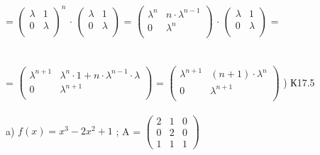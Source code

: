 \documentclass[12pt, a4paper]{article}
\begin{document}
	=
	\begin{math}
		\left(
		\begin{array}{rr}
			\lambda  & 1 \\
			0 & \lambda\\
		\end{array}
		\right ) ^n
	\end{math}
	$\cdot$
	\begin{math}
		\left(
		\begin{array}{rr}
			\lambda  & 1 \\
			0 & \lambda\\
		\end{array}
		\right )
	\end{math}
	=
	\begin{math}
		\left(
		\begin{array}{rr}
			\lambda^n  & n\cdot \lambda^{n - 1} \\
			0 & \lambda^n\\
		\end{array}
		\right ) 
	\end{math}
	$\cdot$
	\begin{math}
		\left(
		\begin{array}{rr}
			\lambda  & 1 \\
			0 & \lambda\\
		\end{array}
		\right )
	\end{math}
	=\\\\\\
	=
	\begin{math}
		\left(
		\begin{array}{rr}
			\lambda^{n + 1}  & \lambda^{n} \cdot 1 + n\cdot \lambda^{n - 1} \cdot \lambda \\
			0 & \lambda^{n + 1}\\
		\end{array}
		\right )
	\end{math}
	=
	\begin{math}
		\left(
		\begin{array}{rr}
			\lambda^{n + 1}  & (n + 1) \cdot \lambda^n \\
			0 & \lambda^{n + 1}\\
		\end{array}
		\right )
	\end{math}
	) К17.5
	\\\\
	a) $f(x) = x^3 - 2x^2 + 1$
	; A = 
	\begin{math}
		\left(
		\begin{array}{rrr}
			2  & 1 & 0\\
			0 & 2 & 0\\
			1 & 1 & 1
		\end{array}
		\right )
	\end{math}
\end{document}
